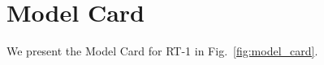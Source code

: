 \documentclass{article} %
\newcommand{\algname}{RT-1\xspace}
\begin{document}
\section{Model Card}
\label{sec:app_model_card}
We present the Model Card for \algname in Fig.~\ref{fig:model_card}.
\end{document}
